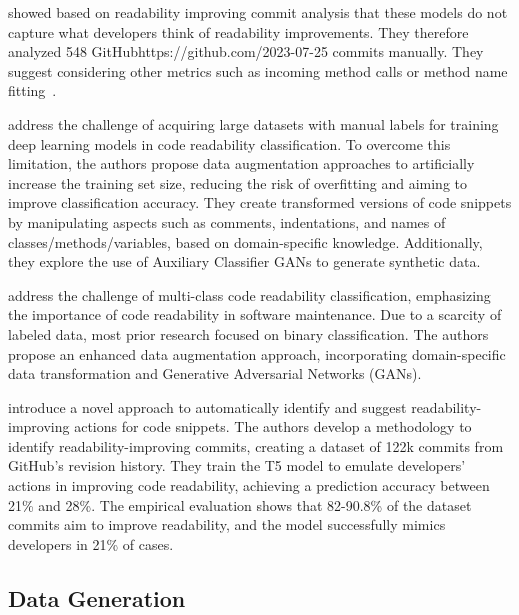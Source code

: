 \documentclass[%
class=scrreprt,
chapterprefix=false,%
open=right,%
twoside=false,%
paper=a4,%
logofile={Logo\_zentral\_farbig\_EN.png},%
thesistype=master,%
UKenglish,%
]{se2thesis}
\begin{document}
	\citeauthor{fakhoury2019improving} showed based on readability improving commit analysis that these models do not capture what developers think of readability improvements. They therefore analyzed 548 GitHub{https://github.com/}{2023-07-25} commits manually. They suggest considering other metrics such as incoming method calls or method name fitting~\cite{fakhoury2019improving}.		
				
	\citeauthor{oliveira2020evaluating} address the challenge of acquiring large datasets with manual labels for training deep learning models in code readability classification. To overcome this limitation, the authors propose data augmentation approaches to artificially increase the training set size, reducing the risk of overfitting and aiming to improve classification accuracy. They create transformed versions of code snippets by manipulating aspects such as comments, indentations, and names of classes/methods/variables, based on domain-specific knowledge. Additionally, they explore the use of Auxiliary Classifier GANs to generate synthetic data.
	
	\citeauthor{mi2022enhanced} address the challenge of multi-class code readability classification, emphasizing the importance of code readability in software maintenance. Due to a scarcity of labeled data, most prior research focused on binary classification. The authors propose an enhanced data augmentation approach, incorporating domain-specific data transformation and Generative Adversarial Networks (GANs).
	
	\citeauthor{vitale2023using} introduce a novel approach to automatically identify and suggest readability-improving actions for code snippets. The authors develop a methodology to identify readability-improving commits, creating a dataset of 122k commits from GitHub's revision history. They train the T5 model to emulate developers' actions in improving code readability, achieving a prediction accuracy between 21\% and 28\%. The empirical evaluation shows that 82-90.8\% of the dataset commits aim to improve readability, and the model successfully mimics developers in 21\% of cases.
	
\subsection{Data Generation} \label{Data Generation}
\end{document}
